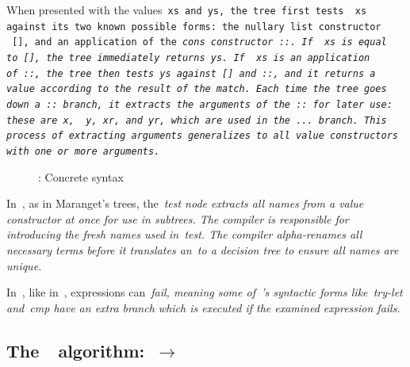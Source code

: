 \documentclass[manuscript,screen, 12pt, nonacm]{acmart}
\begin{document}
  When presented with the values~\tt{xs} and~\tt{ys}, the tree first tests
 ~\tt{xs} against its two known possible forms: the nullary list constructor
 ~\tt{[]}, and an application of the~\it{cons} constructor~\tt{::}. If ~\tt{xs}
 is equal to~\tt{[]}, the tree immediately returns~\tt{ys}. If ~\tt{xs} is an
 application of~\tt{::}, the tree then tests~\tt{ys} against~\tt{[]}
 and~\tt{::}, and it returns a value according to the result of the match. Each
 time the tree goes down a~\tt{::} branch, it extracts the arguments of
 the~\tt{::} for later use: these are~\tt{x}, ~\tt{y},~\tt{xr}, and~\tt{yr},
 which are used in the~\tt{...} branch. This process of extracting arguments
 generalizes to all value constructors with one or more arguments. 

  \begin{figure}
    \begin{center}
    \dcsyntax
    \end{center}
    \caption{\D: Concrete syntax}
    \label{fig:dsyntax}
    \end{figure}



  In~\D, as in Maranget's trees, the~\it{test} node extracts all names from a
  value constructor at once for use in subtrees. The compiler is responsible for
  introducing the fresh names used in~\it{test}. The compiler alpha-renames all
  necessary terms before it translates an~\iffibf to a decision tree to ensure
  all names are unique. 

  In~\D, like in~\VMinus, expressions can~\it{fail}, meaning some of~\D's
  syntactic forms like~\it{try-let} and~\it{cmp} have an extra branch which is
  executed if the examined expression fails. 

    \label{dsemantics}
    \dsemantics


    \subsection{The~\DTran\ algorithm:~\VMinus $\rightarrow$~\D}
\end{document}
